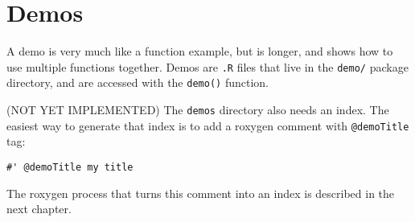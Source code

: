 \section{Demos}

A demo is very much like a function example, but is longer, and shows
how to use multiple functions together. Demos are \texttt{.R} files that
live in the \texttt{demo/} package directory, and are accessed with the
\texttt{demo()} function.

(NOT YET IMPLEMENTED) The \texttt{demos} directory also needs an index.
The easiest way to generate that index is to add a roxygen comment with
\texttt{@demoTitle} tag:

\begin{verbatim}
#' @demoTitle my title
\end{verbatim}

The roxygen process that turns this comment into an index is described
in the next chapter.
